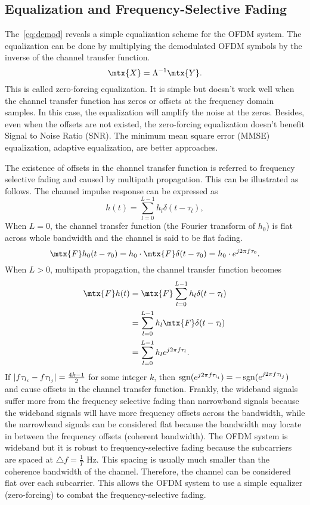 \subsection{Equalization and Frequency-Selective Fading}
The~\cref{eq:demod} reveals a simple equalization scheme for the OFDM system. The equalization can be done by multiplying the demodulated OFDM symbols by the inverse of the channel transfer function.
\begin{equation}
    \mtx{X} = \Lambda^{-1}\mtx{Y}.
\end{equation}
This is called zero-forcing equalization. It is simple but doesn't work well when the channel transfer function has zeros or offsets at the frequency domain samples. In this case, the equalization will amplify the noise at the zeros. Besides, even when the offsets are not existed, the zero-forcing equalization doesn't benefit Signal to Noise Ratio (SNR). The minimum mean square error (MMSE) equalization, adaptive equalization, \etc are better approaches.

The existence of offsets in the channel transfer function is referred to frequency selective fading and caused by multipath propagation. This can be illustrated as follows. The channel impulse response can be expressed as
\begin{equation}
    h(t) = \sum_{l=0}^{L-1}h_l\delta(t-\tau_l),
\end{equation}
When $L=0$, the channel transfer function (the Fourier transform of $h_0$) is flat across whole bandwidth and the channel is said to be flat fading.
\begin{equation}
    \mtx{F}h_0(t-\tau_0) = h_0\cdot\mtx{F}\delta(t-\tau_0) = h_0\cdot e^{j2\pi f\tau_0}.
\end{equation}
When $L>0$, \aka multipath propagation, the channel transfer function becomes
\begin{equation}
    \begin{aligned}
        \mtx{F}h(t)
        &= \mtx{F}\sum_{l=0}^{L-1}h_l\delta(t-\tau_l) \\
        &= \sum_{l=0}^{L-1}h_l\mtx{F}\delta(t-\tau_l) \\
        &= \sum_{l=0}^{L-1}h_l e^{j2\pi f\tau_l}.
    \end{aligned}
\end{equation}
If $\lvert f\tau_{l_i}-f\tau_{l_j}\rvert=\frac{4k-1}{2}$ for some integer $k$, then $\operatorname{\mathrm{sgn}}(e^{j2\pi f\tau_{l_i}})=-\operatorname{\mathrm{sgn}}(e^{j2\pi f\tau_{l_j}})$ and cause offsets in the channel transfer function. Frankly, the wideband signals suffer more from the frequency selective fading than narrowband signals because the wideband signals will have more frequency offsets across the bandwidth, while the narrowband signals can be considered flat because the bandwidth may locate in between the frequency offsets (\aka coherent bandwidth). The OFDM system is wideband but it is robust to frequency-selective fading because the subcarriers are spaced at $\triangle f=\frac{1}{T}$ Hz. This spacing is usually much smaller than the coherence bandwidth of the channel. Therefore, the channel can be considered flat over each subcarrier. This allows the OFDM system to use a simple equalizer (\ie zero-forcing) to combat the frequency-selective fading.

